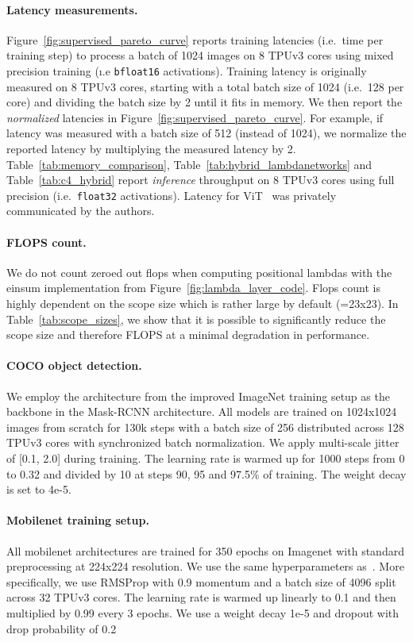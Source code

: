 \documentclass{article} \usepackage{iclr2021_conference,times}
\begin{document}
\paragraph{Latency measurements.}
Figure~\ref{fig:supervised_pareto_curve} reports training latencies (i.e.\ time per training step) to process a batch of 1024 images on 8 TPUv3 cores using mixed precision training (\i.e \texttt{bfloat16} activations).
Training latency is originally measured on 8 TPUv3 cores, starting with a total batch size of 1024 (i.e.\ 128 per core) and dividing the batch size by 2 until it fits in memory.
We then report the \emph{normalized} latencies in Figure~\ref{fig:supervised_pareto_curve}.
For example, if latency was measured with a batch size of 512 (instead of 1024), we normalize the reported latency by multiplying the measured latency by 2.
Table~\ref{tab:memory_comparison}, Table~\ref{tab:hybrid_lambdanetworks} and Table~\ref{tab:c4_hybrid} report \emph{inference} throughput on 8 TPUv3 cores using full precision (i.e.\ \texttt{float32} activations).
Latency for ViT~\citep{dosovitskiy2020image} was privately communicated by the authors.

\vspace{-0.1cm}
\paragraph{FLOPS count.}
We do not count zeroed out flops when computing positional lambdas with the einsum implementation from Figure~\ref{fig:lambda_layer_code}.
Flops count is highly dependent on the scope size which is rather large by default (=23x23).
In Table~\ref{tab:scope_sizes}, we show that it is possible to significantly reduce the scope size and therefore FLOPS at a minimal degradation in performance.

\vspace{-0.1cm}
\paragraph{COCO object detection.}
We employ the architecture from the improved ImageNet training setup as the backbone in the Mask-RCNN architecture.
All models are trained on 1024x1024 images from scratch for 130k steps with a batch size of 256 distributed across 128 TPUv3 cores with synchronized batch normalization.
We apply multi-scale jitter of [0.1, 2.0] during training.
The learning rate is warmed up for 1000 steps from 0 to 0.32 and divided by 10 at steps 90, 95 and 97.5\% of training.
The weight decay is set to 4e-5.

\vspace{-0.1cm}
\paragraph{Mobilenet training setup.}
All mobilenet architectures are trained for 350 epochs on Imagenet with standard preprocessing at 224x224 resolution.
We use the same hyperparameters as~\cite{howard2019searching}.
More specifically, we use RMSProp with 0.9 momentum and a batch size of 4096 split across 32 TPUv3 cores.
The learning rate is warmed up linearly to 0.1 and then multiplied by 0.99 every 3 epochs.
We use a weight decay 1e-5 and dropout with drop probability of 0.2 
\end{document}

